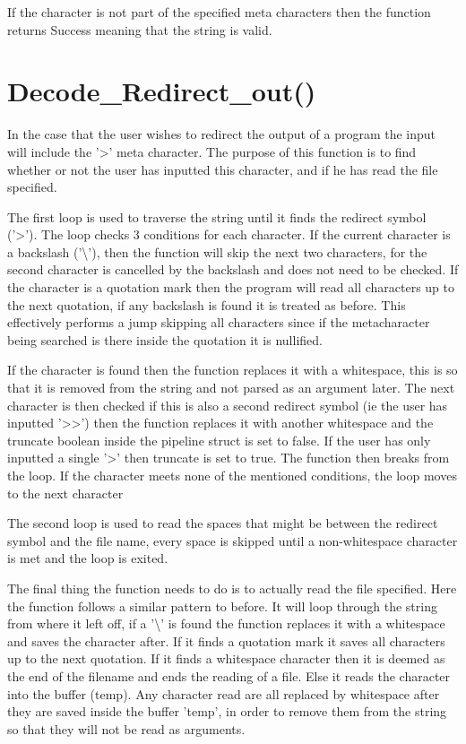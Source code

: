 \documentclass[12pt, a4paper]{report}
\begin{document}
If the character is not part of the specified meta characters then the function returns Success meaning that the string is valid.

\section{Decode\_Redirect\_out()}
In the case that the user wishes to redirect the output of a program the input will include the '>' meta character. The purpose of this function is to find whether or not the user has inputted this character, and if he has read the file specified.

The first loop is used to traverse the string until it finds the redirect symbol ('>'). The loop checks 3 conditions for each character. If the current character is a backslash ('\textbackslash'), then the function will skip the next two characters, for the second character is cancelled by the backslash and does not need to be checked. If the character is a quotation mark then the program will read all characters up to the next quotation, if any backslash is found it is treated as before. This effectively performs a jump skipping all characters since if the metacharacter being searched is there inside the quotation it is nullified.

If the character is found then the function replaces it with a whitespace, this is so that it is removed from the string and not parsed as an argument later. The next character is then checked if this is also a second redirect symbol (ie the user has inputted '>>') then the function replaces it with another whitespace and the truncate boolean inside the pipeline struct is set to false. If the user has only inputted a single '>' then truncate is set to true. The function then breaks from the loop. If the character meets none of the mentioned conditions, the loop moves to the next character

The second loop is used to read the spaces that might be between the  redirect symbol and the file name, every space is skipped until a non-whitespace character is met and the loop is exited.

The final thing the function needs to do is to actually read the file specified. Here the function follows a similar pattern to before. It will loop through the string from where it left off, if a '\textbackslash' is found the function replaces it with a whitespace and saves the character after. If it finds a quotation mark it saves all characters up to the next quotation. If it finds a whitespace character then it is deemed as the end of the filename and ends the reading of a file. Else it reads the character into the buffer (temp). Any character read are all replaced by whitespace after they are saved inside the buffer 'temp', in order to remove them from the string so that they will not be read as arguments.
\end{document}
